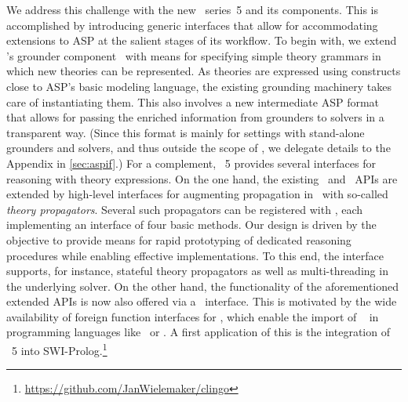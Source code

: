 We address this challenge with the new \clingo\ series~5 and its components.
%
This is accomplished by introducing generic interfaces that allow for accommodating extensions to ASP at the salient stages of its workflow.
%
To begin with,
we extend \clingo's grounder component \gringo\ with means for specifying simple theory grammars in which new theories can be represented.
As theories are expressed using constructs close to ASP's basic modeling language,
the existing grounding machinery takes care of instantiating them.
%
This also involves a new intermediate ASP format that allows for passing the enriched information from grounders to solvers in a transparent way.
(Since this format is mainly for settings with stand-alone grounders and solvers,
 and thus outside the scope of \clingo,
 we delegate details to the Appendix in \ref{sec:aspif}.) %
For a complement,
\clingo~5 provides several interfaces for reasoning with theory expressions.
%
On the one hand,
the existing \lua\ and \python\ APIs are extended by high-level interfaces for
augmenting propagation in \clasp\ with so-called \emph{theory propagators}.
Several such propagators can be registered with \clingo,
each implementing an interface of four basic methods.
Our design is driven by the objective to provide means for rapid prototyping of dedicated reasoning procedures while enabling effective implementations.
To this end,
the interface supports, for instance, stateful theory propagators as well as multi-threading in the underlying solver.
%
On the other hand,
the functionality of the aforementioned extended APIs is now also offered via a \C\ interface.
This is motivated by the wide availability of foreign function interfaces for \C, which enable the import of \clingo\ %
in %
programming languages like \java\ or \haskell.
A first application of this is the integration of \clingo~5 into SWI-Prolog.\footnote{\url{https://github.com/JanWielemaker/clingo}}


